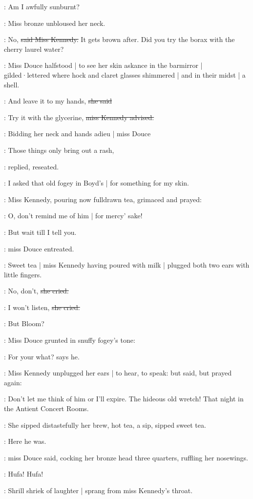 \MissD:
Am I awfully sunburnt?

:
Miss bronze unbloused her neck.

\MissK:
No,
\sout{said Miss Kennedy.}
It gets brown after.
Did you try the borax with the cherry laurel water?

:
Miss Douce halfstood |
to see her skin askance in the barmirror |
gilded·lettered where hock and claret glasses shimmered |
and in their midst |
a shell.

\MissD:
And leave it to my hands,
\sout{she said}

\MissK:
Try it with the glycerine,
\sout{miss Kennedy advised.}

:
Bidding her neck and hands adieu |
miss Douce

\MissD:
Those things only bring out a rash,

:
replied,
reseated.

\MissD:
I asked that old fogey in Boyd's |
for something for my skin.

:
Miss Kennedy,
pouring now fulldrawn tea,
grimaced and prayed:

\MissK:
O, don't remind me of him |
for mercy' sake!

\MissD:
But wait till I tell you.

:
miss Douce entreated.

:
Sweet tea |
miss Kennedy having poured with milk |
plugged both two ears
with little fingers.

\MissK:
No,
don't,
\sout{she cried.}

\MissK:
I won't listen,
\sout{she cried.}

:
But Bloom?

:
Miss Douce grunted in snuffy fogey's tone:

\MissD:
For your what?
says he.

:
Miss Kennedy unplugged her ears |
to hear,
to speak:
but said,
but prayed again:

\MissK:
Don't let me think of him or I'll expire.
The hideous old wretch!
That night in the Antient Concert Rooms.

:
She sipped distastefully her brew,
hot tea,
a sip,
sipped sweet tea.

\MissD:
Here he was.

:
miss Douce said,
cocking her bronze head three quarters,
ruffling her nosewings.

\MissD:
Hufa!
Hufa!

:
Shrill shriek of laughter |
sprang from miss Kennedy's throat.

